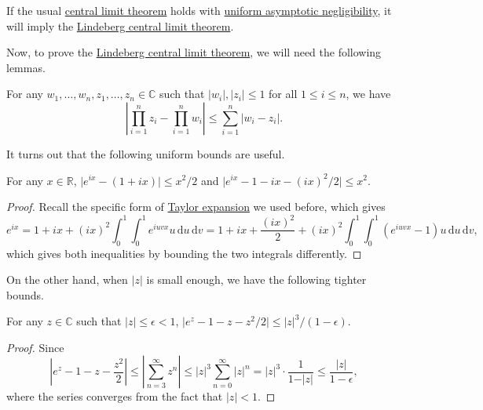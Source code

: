 \begin{remark}
	If the usual \hyperref[thm:CLT]{central limit theorem} holds with \hyperref[def:uniform-asymptotic-negligibility]{uniform asymptotic negligibility}, it will imply the \hyperref[thm:Lindeberg-CLT]{Lindeberg central limit theorem}.
\end{remark}

Now, to prove the \hyperref[thm:Lindeberg-CLT]{Lindeberg central limit theorem}, we will need the following lemmas.

\begin{lemma}\label{lma:Lindeberg-CLT-1}
	For any \(w_1, \dots , w_n, z_1, \dots , z_n \in \mathbb{C} \) such that \(\vert w_i \vert , \vert z_i \vert \leq 1\) for all \(1 \leq i \leq n\), we have
	\[
		\left\vert \prod_{i=1}^{n} z_i - \prod_{i=1}^{n} w_i \right\vert
		\leq \sum_{i=1}^{n} \vert w_i - z_i \vert .
	\]
\end{lemma}

It turns out that the following uniform bounds are useful.

\begin{lemma}\label{lma:Lindeberg-CLT-2}
	For any \(x \in \mathbb{R} \), \(\vert e^{ix} - (1 + ix) \vert \leq x^2 / 2\) and \(\vert e^{ix} - 1 - ix - (ix)^2 / 2 \vert \leq x^2\).
\end{lemma}
\begin{proof}
	Recall the specific form of \hyperref[note:lec10]{Taylor expansion} we used before, which gives
	\[
		e^{ix}
		= 1 + ix + (ix)^2 \int_{0}^{1} \int_{0}^{1} e^{i u v x} u \,\mathrm{d}u  \,\mathrm{d}v
		= 1 + ix + \frac{(ix)^2}{2} + (ix)^2 \int_{0}^{1} \int_{0}^{1} (e^{i u v x} - 1) u \,\mathrm{d}u  \,\mathrm{d}v,
	\]
	which gives both inequalities by bounding the two integrals differently.
\end{proof}

On the other hand, when \(\vert z \vert \) is small enough, we have the following tighter bounds.

\begin{lemma}\label{lma:Lindeberg-CLT-3}
	For any \(z \in \mathbb{C} \) such that \(\vert z \vert \leq \epsilon < 1\), \(\vert e^z - 1 - z - z^2 / 2 \vert \leq \vert z \vert ^3 / (1 - \epsilon )\).
\end{lemma}
\begin{proof}
	Since
	\[
		\left\vert e^z - 1 - z - \frac{z^2}{2} \right\vert
		\leq \left\vert \sum_{n=3}^{\infty} z^n \right\vert
		\leq \vert z \vert ^3 \sum_{n=0}^{\infty} \vert z \vert ^n
		= \vert z \vert ^3 \cdot \frac{1}{1 - \vert z \vert }
		\leq \frac{\vert z \vert }{1 - \epsilon },
	\]
	where the series converges from the fact that \(\vert z \vert < 1\).
\end{proof}

